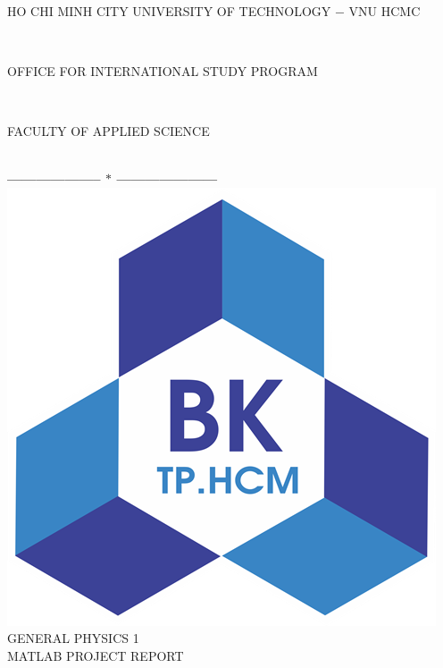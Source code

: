 \documentclass[13pt,a4paper]{report}
\begin{document}
\fontsize{13pt}{18pt}\selectfont
\begin{titlepage}
\thispagestyle{empty}
\thisfancypage{%
\setlength{\fboxsep}{0pt}%
\fbox}{} %
\

\begin{center}
\begin{large}
HO CHI MINH CITY UNIVERSITY OF TECHNOLOGY $-$ VNU HCMC
\end{large} \\
\begin{large}
OFFICE FOR INTERNATIONAL STUDY PROGRAM
\end{large} \\
\begin{large}
FACULTY OF APPLIED SCIENCE
\end{large} \\
\textbf{--------------------  $\ast$  ---------------------}\\[2.75cm]

\includegraphics[scale=1]{logoBK.png}\\[1cm]
{\fontsize{20pt}{1}\selectfont GENERAL PHYSICS 1}\\[1ex]
{\fontsize{20pt}{1}\selectfont MATLAB PROJECT REPORT}\\[2.75cm]
\end{center}


\end{titlepage}
\end{document}
